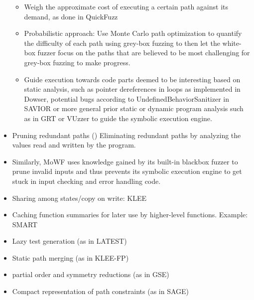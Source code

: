 \documentclass{article}
\begin{document}
\begin{multicols}{2}
\begin{itemize}
\begin{itemize}
                  \item Weigh the approximate cost of executing a certain path against its demand, as done in QuickFuzz\cite{QuickFuzz}
                  \item Probabilistic approach: Use Monte Carlo path optimization to quantify the difficulty of each path using grey-box fuzzing to then let the white-box fuzzer focus on the paths that are believed to be most challenging for grey-box fuzzing to make progress.\cite{DigFuzz}
                  \item Guide execution towards code parts deemed to be interesting based on static analysis, such as pointer dereferences in loops as implemented in Dowser\cite{Dowser}, potential bugs according to UndefinedBehaviorSanitizer\cite{UndefinedBehaviorSanitizer} in SAVIOR\cite{SAVIOR} or more general prior static or dynamic program analysis such as in GRT\cite{GRT} or VUzzer\cite{VUzzer} to guide the symbolic execution engine.
              \end{itemize}
        \item Pruning redundant paths (\cite{RWset}) Eliminating redundant paths by analyzing the values read and written by the program.
        \item Similarly, MoWF\cite{MoWF} uses knowledge gained by its built-in blackbox fuzzer to prune invalid inputs and thus prevents its symbolic execution engine to get stuck in input checking and error handling code.
        \item Sharing among states/copy on write: KLEE\cite{KLEE}
        \item Caching function summaries for later use by higher-level functions. Example: SMART\cite{SMART}
        \item Lazy test generation (as in LATEST\cite{LATEST})
        \item Static path merging (as in KLEE-FP\cite{KLEEFP})
        \item partial order and symmetry reductions (as in GSE\cite{GSE})
        \item Compact representation of path constraints (as in SAGE\cite{SAGE})
    \end{itemize}


\end{multicols}
\end{document}
